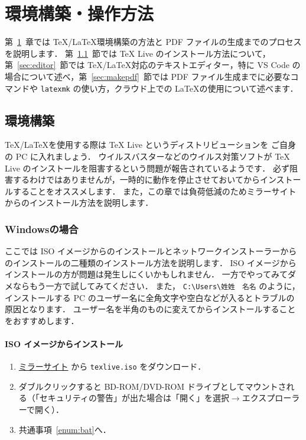 \chapter{環境構築・操作方法}
\label{ch:howtouse}

第~\ref{ch:howtouse}~章では \TeX/\LaTeX 環境構築の方法と PDF ファイルの生成までのプロセスを説明します．
第~\ref{sec:environment}~節では TeX Live のインストール方法について，第~\ref{sec:editor}~節では \TeX/\LaTeX 対応のテキストエディター，特に VS Code の場合について述べ，第~\ref{sec:makepdf}~節では PDF ファイル生成までに必要なコマンドや \verb|latexmk| の使い方，クラウド上での \LaTeX の使用について述べます．

\section{環境構築}
\label{sec:environment}

\TeX/\LaTeX を使用する際は TeX Live というディストリビューションを ご自身の PC に入れましょう．
ウイルスバスターなどのウイルス対策ソフトが TeX Live のインストールを阻害するという問題が報告されているようです．
必ず阻害するわけではありませんが，一時的に動作を停止させておいてからインストールすることをオススメします．
また，この章では負荷低減のためミラーサイトからのインストール方法を説明します．

\subsection{Windowsの場合}
\label{ssec:windows}

ここでは ISO イメージからのインストールとネットワークインストーラーからのインストールの二種類のインストール方法を説明します．
ISO イメージからインストールの方が問題は発生しにくいかもしれません．
一方でやってみてダメならもう一方で試してみてください．
また， \verb|C:\Users\姓姓　名名| のように，インストールする PC のユーザー名に全角文字や空白などが入るとトラブルの原因となります．
ユーザー名を半角のものに変えてからインストールすることをおすすめします．

\subsubsection*{ISO イメージからインストール}

\begin{enumerate}
    \item \href{http://mirror.ctan.org/systems/texlive/Images/}{ミラーサイト} から \verb|texlive.iso| をダウンロード．
    \item ダブルクリックすると BD-ROM/DVD-ROM ドライブとしてマウントされる（「セキュリティの警告」が出た場合は「開く」を選択$\to$エクスプローラーで開く）．
    \item 共通事項~\ref{enum:bat}へ．
\end{enumerate}


